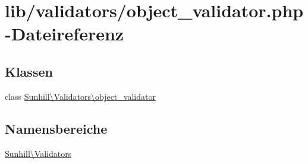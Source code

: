 \hypertarget{object__validator_8php}{}\section{lib/validators/object\+\_\+validator.php-\/\+Dateireferenz}
\label{object__validator_8php}
\subsection*{Klassen}
\begin{DoxyCompactItemize}
\item 
class \hyperlink{classSunhill_1_1Validators_1_1object__validator}{Sunhill\textbackslash{}\+Validators\textbackslash{}object\+\_\+validator}
\end{DoxyCompactItemize}
\subsection*{Namensbereiche}
\begin{DoxyCompactItemize}
\item 
 \hyperlink{namespaceSunhill_1_1Validators}{Sunhill\textbackslash{}\+Validators}
\end{DoxyCompactItemize}
